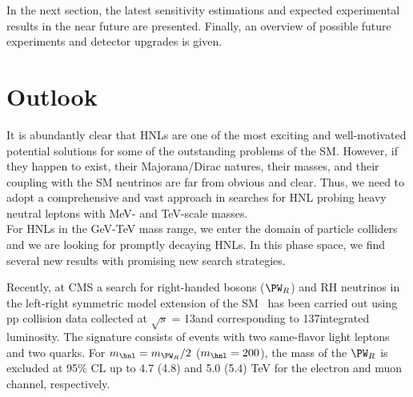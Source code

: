 In the next section, the latest sensitivity
estimations and expected experimental results in the near future are presented. Finally,
an overview of possible future experiments
and detector upgrades is given. 


\section{Outlook}
It is abundantly clear that HNLs are one of the most
exciting and well-motivated potential solutions for some of the
outstanding problems of the SM. However, if they happen to exist, their
Majorana/Dirac natures, their masses, and their coupling with the SM
neutrinos are far from obvious and clear. Thus, we need to adopt a
comprehensive and vast approach in searches for HNL probing heavy
neutral leptons with MeV- and TeV-scale masses.\\

For HNLs in the GeV-TeV mass range, we enter the domain of 
particle colliders and we are looking for promptly decaying HNLs. 
In this phase space, we find several new results with promising new search strategies.

Recently, at CMS a search for right-handed bosons ($\PW_R$)
and RH neutrinos in the left-right symmetric model extension of the
SM~\cite{CMS-PAS-EXO-20-002} has been carried out using pp collision data collected at $\sqrt{s}$ =
 13\TeV and corresponding to 137\fbinv integrated luminosity. The
 signature consists of events with two same-flavor light leptons and
 two quarks. For $m_\hnl = m_{\PW_{R}}/2$ ($m_\hnl = 200$\GeV), the
 mass of the $\PW_R$ is excluded at 95\% CL up to 4.7 (4.8) and 5.0 (5.4) TeV for the electron and muon
channel, respectively. 

